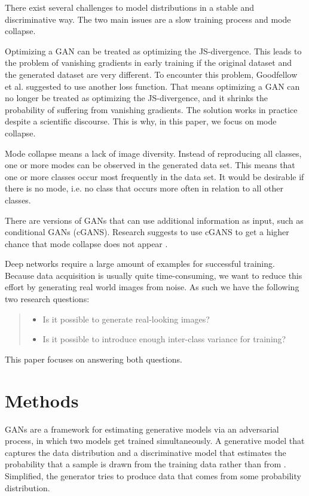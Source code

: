 \documentclass[journal]{IEEEtran}
\begin{document}
There exist several challenges to model distributions in a stable and discriminative way. The two main issues are a slow training process and mode collapse.

Optimizing a GAN can be treated as optimizing the JS-divergence. This leads to the problem of vanishing gradients in early training if the original dataset and the generated dataset are very different. To encounter this problem, Goodfellow et al. suggested to use another loss function. That means optimizing a GAN can no longer be treated as optimizing the JS-divergence, and it shrinks the probability of suffering from vanishing gradients. The solution works in practice despite a scientific discourse. This is why, in this paper, we focus on mode collapse. 

Mode collapse means a lack of image diversity. Instead of reproducing all classes, one or more modes can be observed in the generated data set. This means that one or more classes occur most frequently in the data set. It would be desirable if there is no mode, i.e. no class that occurs more often in relation to all other classes. 

There are versions of GANs that can use additional information as input, such as conditional GANs (cGANS). Research suggests to use cGANS to get a higher chance that mode collapse does not appear  \cite{DBLP:journals/corr/IsolaZZE16,DBLP:journals/corr/SalimansGZCRC16}. 

Deep networks require a large amount of examples for successful training. Because data acquisition is usually quite  time-consuming, we want to reduce this effort by generating real world images from noise. As such we have the following two research questions:\\

\begin{quote}
	\itshape{\begin{itemize}
			\item Is it possible to generate real-looking images?
			\item Is it possible to introduce enough inter-class variance for training?
		\end{itemize}}
\end{quote}

This paper focuses on answering both questions.

\section{Methods}
GANs are a framework for estimating generative models via an adversarial process, in which two models get trained simultaneously. A generative model  that captures the data distribution and a discriminative model  that estimates the probability that a sample is drawn from the training data rather than from  \cite{Goodfellow-et-al-2016}. Simplified, the generator tries to produce data that comes from some probability distribution. 
\end{document}
